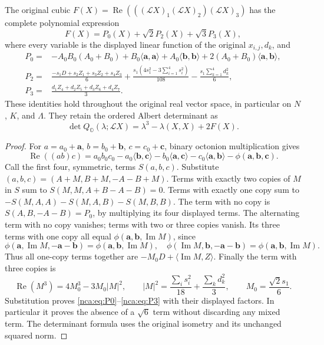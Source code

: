 \begin{theorem}
\label{nca:thm:polynomial}
The original cubic
\(F(X)=\operatorname{Re}(((\mathcal LX)_1(\mathcal LX)_2)
                                           (\mathcal LX)_3)\)
has the complete polynomial expression
\begin{equation}
 F(X)=P_0(X)+\sqrt2P_2(X)+\sqrt3P_3(X),
 \label{nca:eq:polynomial}
\end{equation}
where every variable is the displayed linear function of the original
\(x_{i,j},d_k\), and
\begin{align}
 P_0={}&-A_0B_0(A_0+B_0)+B_0\langle\mathbf a,\mathbf a\rangle
              +A_0\langle\mathbf b,\mathbf b\rangle
              +2(A_0+B_0)\langle\mathbf a,\mathbf b\rangle,
                \label{nca:eq:P0}\\
 P_2={}&\frac{-s_1D+s_2Z_1+s_3Z_2+s_4Z_3}{6}
       +\frac{s_1(4s_1^2-3\sum_{i=1}^4s_i^2)}{108}
       -\frac{s_1\sum_{k=1}^4d_k^2}{6},\label{nca:eq:P2}\\
 P_3={}&\frac{d_1Z_4+d_2Z_5+d_3Z_6+d_4Z_7}{3}.
                  \label{nca:eq:P3}
\end{align}
These identities hold throughout the original real vector space, in
particular on \(N\), \(K\), and \(\Lambda\). They retain the ordered
Albert determinant as
\[
 \det Q_{\mathbb O}(\lambda;\mathcal LX)
                =\lambda^3-\lambda(X,X)+2F(X).
\]
\end{theorem}

\begin{proof}
For \(a=a_0+\mathbf a\), \(b=b_0+\mathbf b\),
\(c=c_0+\mathbf c\), binary octonion multiplication gives
\[
 \operatorname{Re}((ab)c)
  =a_0b_0c_0-a_0\langle\mathbf b,\mathbf c\rangle
   -b_0\langle\mathbf a,\mathbf c\rangle
   -c_0\langle\mathbf a,\mathbf b\rangle
   -\phi(\mathbf a,\mathbf b,\mathbf c).
\]
Call the first four, symmetric, terms \(S(a,b,c)\).  Substitute
\((a,b,c)=(A+M,B+M,-A-B+M)\).  Terms with exactly two copies
of \(M\) in \(S\) sum to \(S(M,M,A+B-A-B)=0\). Terms
with exactly one copy sum to
\(-S(M,A,A)-S(M,A,B)-S(M,B,B)\).  The term with no copy is
\(S(A,B,-A-B)=P_0\), by multiplying its four displayed terms.
The alternating term with no copy vanishes; terms with two or
three copies vanish. Its three terms with one copy all equal
\(\phi(\mathbf a,\mathbf b,\operatorname{Im}M)\), since
\[
 \phi(\mathbf a,\operatorname{Im}M,-\mathbf a-\mathbf b)
 =\phi(\mathbf a,\mathbf b,\operatorname{Im}M),\quad
 \phi(\operatorname{Im}M,\mathbf b,-\mathbf a-\mathbf b)
 =\phi(\mathbf a,\mathbf b,\operatorname{Im}M).
\]
Thus all one-copy terms together are
\(-M_0D+\langle\operatorname{Im}M,Z\rangle\).
Finally the term with three copies is
\[
 \operatorname{Re}(M^3)=4M_0^3-3M_0|M|^2,
 \qquad |M|^2=\frac{\sum_i s_i^2}{18}
                              +\frac{\sum_kd_k^2}{3},
 \qquad M_0=\frac{\sqrt2s_1}{6}.
\]
Substitution proves \eqref{nca:eq:P0}--\eqref{nca:eq:P3} with
their displayed factors. In particular it proves the absence of a
\(\sqrt6\) term without discarding any mixed term. The determinant
formula uses the original isometry and its unchanged squared norm.
\end{proof}

